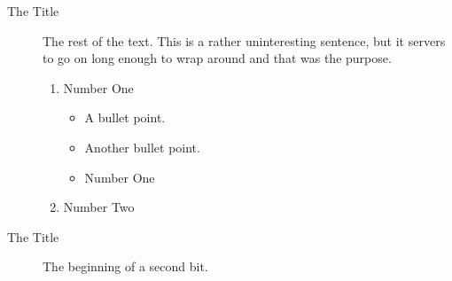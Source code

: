\documentclass[12pt]{letter}
\begin{document}
\begin{description}
  \item [The Title] The rest of the text.  This is a rather uninteresting
        sentence, but it servers to go on long enough to wrap around and
        that was the purpose.
    \begin{enumerate}
      \item Number One
        \begin{itemize}
          \item A bullet point.
          \item Another bullet point.
          \item Number One
        \end{itemize}
      \item Number Two
    \end{enumerate}
  \item [The Title] The beginning of a second bit.
\end{description}
\end{document}
